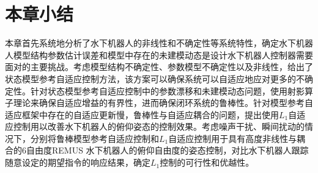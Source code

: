 \section{本章小结 }

本章首先系统地分析了水下机器人的非线性和不确定性等系统特性，确定水下机器人模型结构参数估计误差和模型中存在的未建模动态是设计水下机器人控制器需要面对的主要挑战。考虑模型结构不确定性、参数模型不确定性以及非线性，给出了状态模型参考自适应控制方法，该方案可以确保系统可以自适应地应对更多的不确定性。针对状态模型参考自适应控制中的参数漂移和未建模动态问题，使用射影算子理论来确保自适应增益的有界性，进而确保闭环系统的鲁棒性。针对模型参考自适应框架中存在的自适应更新慢，鲁棒性与自适应耦合的问题，提出使用$L_1$自适应控制用以改善水下机器人的俯仰姿态的控制效果。考虑噪声干扰、瞬间扰动的情况下，分别将鲁棒模型参考自适应控制和$L_1$自适应控制用于具有高度非线性与耦合的6自由度REMUS 水下机器人的俯仰自由度的姿态控制，对比水下机器人跟踪随意设定的期望指令的响应结果，确定$L_1$控制的可行性和优越性。

